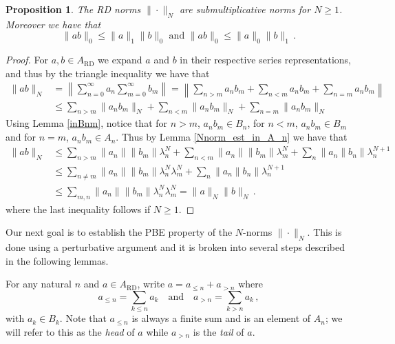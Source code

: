 \documentclass[12pt,reqno]{amsart}
\numberwithin{equation}{section}
\newtheorem{prop}[theo]{{\sc \bf Proposition}}
\begin{document}
\begin{prop}
The RD norms $\|\cdot\|_N$ are submultiplicative norms for $N\ge1$.  Moreover we have that
\begin{equation*}
\|ab\|_0\le \|a\|_1\|b\|_0\textrm{ and }\|ab\|_0\le\|a\|_0\|b\|_1\,.
\end{equation*}
\end{prop}
\begin{proof}
For $a,b\in A_\textrm{RD}$ we expand $a$ and $b$ in their respective series representations, and thus by the triangle inequality we have that
\begin{equation*}
\begin{aligned}
\|ab\|_N &= \left\|\sum_{n=0}^\infty a_n\sum_{m=0}^\infty b_m\right\| = \left\|\sum_{n>m}a_nb_m + \sum_{n<m}a_nb_m + \sum_{n=m}a_nb_m\right\|\\
&\le \sum_{n>m}\|a_nb_m\|_N + \sum_{n<m}\|a_nb_m\|_N + \sum_{n=m}\|a_nb_m\|_N
\end{aligned}
\end{equation*}
Using Lemma \ref{inBnm}, notice that for $n>m$, $a_nb_m\in B_n$, for $n<m$, $a_nb_m\in B_m$ and for $n=m$, $a_nb_m\in A_n$.  Thus by Lemma \ref{Nnorm_est_in_A_n} we have that
\begin{equation*}
\begin{aligned}
\|ab\|_N &\le \sum_{n>m}\|a_n\|\|b_m\|\lambda_n^N + \sum_{n<m}\|a_n\|\|b_m\|\lambda_m^N + \sum_n\|a_n\|b_n\|\lambda_n^{N+1} \\
&\le \sum_{n\neq m}\|a_n\|\|b_m\|\lambda_n^N\lambda_m^N + \sum_n\|a_n\|b_n\|\lambda_n^{N+1}\\
&\le \sum_{m,n}\|a_n\|\|b_m\|\lambda_n^N\lambda_m^N = \|a\|_N\|b\|_N\,.
\end{aligned}
\end{equation*}
where the last inequality follows if $N\ge1$.
\end{proof}

Our next goal is to establish the PBE property of the $N$-norms $\|\cdot\|_N$. This is done using a perturbative argument and it is broken into several steps described in the following lemmas.

For any natural $n$ and $a\in A_\textrm{RD}$, write $a=a_{\leq n} + a_{>n}$ where 
\begin{equation*}
a_{\leq n} = \sum_{k\le n}a_k \quad \text{and}\quad a_{> n} = \sum_{k>n}a_k\,,
\end{equation*}
with $a_k\in B_k$. Note that $a_{\leq n}$ is always a finite sum and is an element of $A_n$; we will refer to this as the \textit{head} of $a$ while $a_{> n}$ is the \textit{tail} of $a$.
\end{document}
